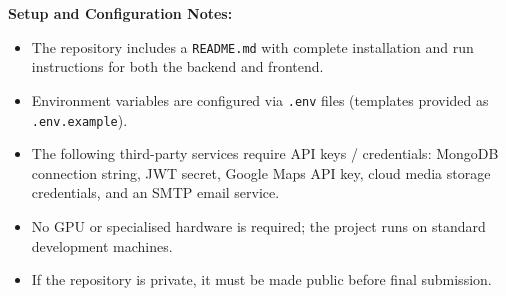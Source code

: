 \vspace{0.5cm}

\noindent
\textbf{Setup and Configuration Notes:}

\begin{itemize}
    \item The repository includes a \texttt{README.md} with complete installation and run instructions for both the backend and frontend.
    \item Environment variables are configured via \texttt{.env} files (templates provided as \texttt{.env.example}).
    \item The following third-party services require API keys / credentials: MongoDB connection string, JWT secret, Google Maps API key, cloud media storage credentials, and an SMTP email service.
    \item No GPU or specialised hardware is required; the project runs on standard development machines.
    \item If the repository is private, it must be made public before final submission.
\end{itemize}
